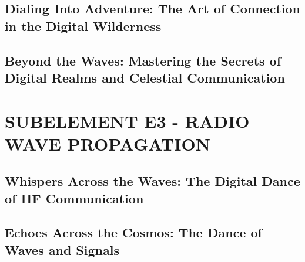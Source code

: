 \documentclass[12pt]{book}
\begin{document}
\section{Dialing Into Adventure: The Art of Connection in the Digital Wilderness}












\section{Beyond the Waves: Mastering the Secrets of Digital Realms and Celestial Communication}











\chapter{SUBELEMENT E3 - RADIO WAVE PROPAGATION}
\section{Whispers Across the Waves: The Digital Dance of HF Communication}













\section{Echoes Across the Cosmos: The Dance of Waves and Signals}














\end{document}
